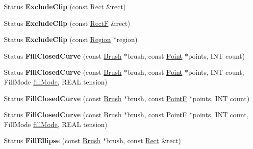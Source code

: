 \begin{DoxyCompactItemize}
\item 
\mbox{\label{class_graphics_a4796b3d839f4c91059d64cff2b4ac897}} 
Status {\bfseries Exclude\+Clip} (const \hyperlink{struct_rect}{Rect} \&rect)
\item 
\mbox{\label{class_graphics_a5104d0c0d79f3bc098b0dbe037c8ac66}} 
Status {\bfseries Exclude\+Clip} (const \hyperlink{struct_rect_f}{RectF} \&rect)
\item 
\mbox{\label{class_graphics_a516133f4823947c6b3c2ce25bd2fa693}} 
Status {\bfseries Exclude\+Clip} (const \hyperlink{class_region}{Region} $\ast$region)
\item 
\mbox{\label{class_graphics_a429959aa7ce9eca8a5d77b81c4f2e9a7}} 
Status {\bfseries Fill\+Closed\+Curve} (const \hyperlink{class_brush}{Brush} $\ast$brush, const \hyperlink{struct_point}{Point} $\ast$points, I\+NT count)
\item 
\mbox{\label{class_graphics_a877da762fbb6fb76b50a4019218e6b25}} 
Status {\bfseries Fill\+Closed\+Curve} (const \hyperlink{class_brush}{Brush} $\ast$brush, const \hyperlink{struct_point}{Point} $\ast$points, I\+NT count, Fill\+Mode \hyperlink{interfacevoid}{fill\+Mode}, R\+E\+AL tension)
\item 
\mbox{\label{class_graphics_a02247696f148e4a2c1079eece4e1362a}} 
Status {\bfseries Fill\+Closed\+Curve} (const \hyperlink{class_brush}{Brush} $\ast$brush, const \hyperlink{struct_point_f}{PointF} $\ast$points, I\+NT count)
\item 
\mbox{\label{class_graphics_a02755ed3c686ab25a58d285ce6ae4012}} 
Status {\bfseries Fill\+Closed\+Curve} (const \hyperlink{class_brush}{Brush} $\ast$brush, const \hyperlink{struct_point_f}{PointF} $\ast$points, I\+NT count, Fill\+Mode \hyperlink{interfacevoid}{fill\+Mode}, R\+E\+AL tension)
\item 
\mbox{\label{class_graphics_a472a0ed7f0e5c0f6326f4c5d26080ac3}} 
Status {\bfseries Fill\+Ellipse} (const \hyperlink{class_brush}{Brush} $\ast$brush, const \hyperlink{struct_rect}{Rect} \&rect)
\item 
\mbox{\label{class_graphics_a905aadbb6ac4297fe5646af41296bb7a}} 

\end{DoxyCompactItemize}
